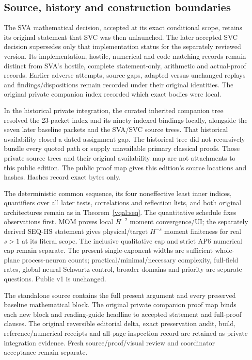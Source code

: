 \subsection{Source, history and construction boundaries}
\label{sva:boundaries}

The SVA mathematical decision, accepted at its exact conditional scope,
retains its original statement that SVC was then unlaunched. The later
accepted SVC decision supersedes only that implementation status for the
separately reviewed version. Its implementation, hostile, numerical and
code-matching records remain distinct from SVA's hostile, complete statement-only,
arithmetic and actual-proof records.
Earlier adverse attempts, source gaps, adapted versus unchanged replays
and findings/dispositions remain recorded under their original identities.
The original private companion index recorded which exact bodies were local.

In the historical private integration, the curated inherited companion
tree resolved the 23-packet index and its ninety indexed bindings locally,
alongside the seven later baseline packets and the SVA/SVC source trees.
That historical availability closed a dated assignment gap. The historical
tree did not recursively bundle every quoted path or supply unavailable
primary classical proofs. Those private source trees and their original
availability map are not attachments to this public edition. The public
proof map gives this edition's source locations and hashes. Hashes record
exact bytes only.

The deterministic common sequence, its four noneffective least inner
indices, quantifiers over all later tests, correlations and reflection
lists, and both
original architectures remain as in Theorem~\ref{vqal:seq}.
The quantitative schedule fixes observations first. MOM proves local
$H^{-2}$ moment convergence/UI; the separately derived SEQ-HS statement
gives physical/target $H^{-s}$ moment finiteness for real $s>1$ at its
literal scope. The inclusive qualitative cap and strict AP6 numerical
cap remain separate. The present single-exponent widths are sufficient
whole-plane process-neuron counts; practical/minimal/necessary complexity,
full-field rates, global neural Schwartz control, broader domains and
priority are separate questions. Public v1 is unchanged.

The standalone source contains the full present argument and every
preserved baseline mathematical block. The original private companion proof map binds each
new block and reading-guide headline to accepted statement and full-proof
clauses. The original reversible editorial delta, exact preservation audit,
build, reference/numerical receipts and all-page inspection record are
retained as private integration evidence. Fresh source/proof/visual review and coordinator
acceptance remain separate.

